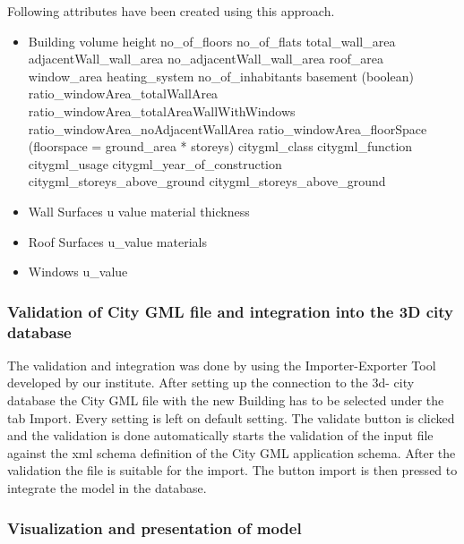 Following attributes have been created using this approach.
\begin{itemize}
\item Building
\subitem volume
\subitem height
\subitem no\_of\_floors
\subitem no\_of\_flats
\subitem total\_wall\_area
\subitem adjacentWall\_wall\_area
\subitem no\_adjacentWall\_wall\_area
\subitem roof\_area
\subitem window\_area 
\subitem heating\_system
\subitem no\_of\_inhabitants
\subitem basement (boolean)
\subitem ratio\_windowArea\_totalWallArea
\subitem ratio\_windowArea\_totalAreaWallWithWindows
\subitem ratio\_windowArea\_noAdjacentWallArea 
\subitem ratio\_windowArea\_floorSpace (floorspace = ground\_area * storeys)
\subitem citygml\_class
\subitem citygml\_function
\subitem citygml\_usage
\subitem citygml\_year\_of\_construction
\subitem citygml\_storeys\_above\_ground
\subitem citygml\_storeys\_above\_ground
\item Wall Surfaces
\subitem u value
\subitem material
\subitem thickness
\item Roof Surfaces 
\subitem u\_value
\subitem materials
\item Windows
\subitem u\_value
\end{itemize}



\subsubsection{Validation of City GML file and integration into the 3D city database}

The validation and integration was done by using the Importer-Exporter Tool developed by our institute. After setting up the connection to the 3d- city database the City GML file with the new Building has to be selected under the tab Import. Every setting is left on default setting. The validate button is clicked and the validation is done automatically starts the validation of the input file against the xml schema definition of the City GML application schema. After the validation the file is suitable for the import.  The button import is then pressed to integrate the model in the database.

\subsubsection{Visualization and presentation of model }

